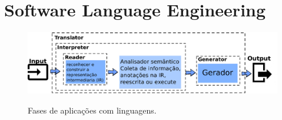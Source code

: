 





\section{Software Language Engineering}\label{sec:softEng}

\begin{figure}[h]
	\center
	\includegraphics[scale=0.9]{Imagens/stagesLanguageApp}
	\label{fig:stagesLanguageApp}
	\caption{Fases de aplicações com linguagens.}
\end{figure}

